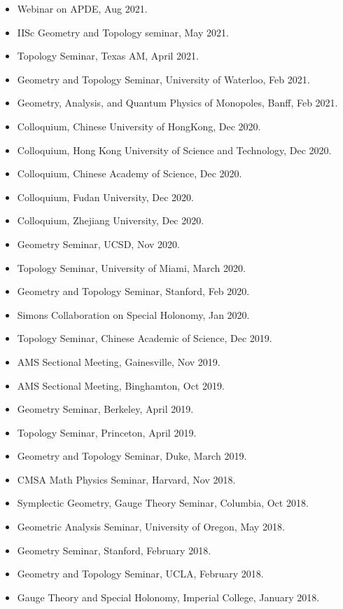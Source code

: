 \documentclass[a4paper,10pt]{article}
\begin{document}
\begin{itemize}[leftmargin=1.5cm]
    \item Webinar on APDE, Aug 2021.
    \item IISc Geometry and Topology seminar, May 2021.
    \item Topology Seminar, Texas AM, April 2021.
    \item Geometry and Topology Seminar, University of Waterloo, Feb 2021.
    \item Geometry, Analysis, and Quantum Physics of Monopoles, Banff, Feb 2021.
    \item Colloquium, Chinese University of HongKong, Dec 2020.
    \item Colloquium, Hong Kong University of Science and Technology, Dec 2020.
    \item Colloquium, Chinese Academy of Science, Dec 2020.
    \item Colloquium, Fudan University, Dec 2020.
    \item Colloquium, Zhejiang University, Dec 2020.
    \item Geometry Seminar, UCSD, Nov 2020.
    \item Topology Seminar, University of Miami, March 2020.
    \item Geometry and Topology Seminar, Stanford, Feb 2020.
    \item Simons Collaboration on Special Holonomy, Jan 2020.
    \item Topology Seminar, Chinese Academic of Science, Dec 2019.
    \item AMS Sectional Meeting, Gainesville, Nov 2019.
    \item AMS Sectional Meeting, Binghamton, Oct 2019.
    \item Geometry Seminar, Berkeley, April 2019.
    \item Topology Seminar, Princeton, April 2019.
    \item Geometry and Topology Seminar, Duke, March 2019.
    \item CMSA Math Physics Seminar, Harvard, Nov 2018.
    \item Symplectic Geometry, Gauge Theory Seminar, Columbia, Oct 2018.
    \item Geometric Analysis Seminar, University of Oregon, May 2018.
    \item Geometry Seminar, Stanford, February 2018.
    \item Geometry and Topology Seminar, UCLA, February 2018.
    \item Gauge Theory and Special Holonomy, Imperial College, January 2018.

\end{itemize}
\end{document}
